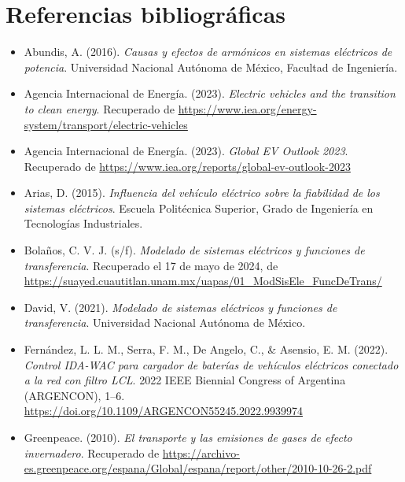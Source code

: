 \section{Referencias bibliogr\'aficas}
\label{sec:referencias}

\begin{itemize}
  \item Abundis, A. (2016). \textit{Causas y efectos de arm\'onicos en sistemas el\'ectricos de potencia}. Universidad Nacional Aut\'onoma de M\'exico, Facultad de Ingenier\'ia.
  
  \item Agencia Internacional de Energ\'ia. (2023). \textit{Electric vehicles and the transition to clean energy}. Recuperado de \url{https://www.iea.org/energy-system/transport/electric-vehicles}
  
  \item Agencia Internacional de Energ\'ia. (2023). \textit{Global EV Outlook 2023}. Recuperado de \url{https://www.iea.org/reports/global-ev-outlook-2023}
  
  \item Arias, D. (2015). \textit{Influencia del veh\'iculo el\'ectrico sobre la fiabilidad de los sistemas el\'ectricos}. Escuela Polit\'ecnica Superior, Grado de Ingenier\'ia en Tecnolog\'ias Industriales.
  
  \item Bola\~nos, C. V. J. (s/f). \textit{Modelado de sistemas el\'ectricos y funciones de transferencia}. Recuperado el 17 de mayo de 2024, de \url{https://suayed.cuautitlan.unam.mx/uapas/01_ModSisEle_FuncDeTrans/}
  
  \item David, V. (2021). \textit{Modelado de sistemas el\'ectricos y funciones de transferencia}. Universidad Nacional Aut\'onoma de M\'exico.
  
  \item Fern\'andez, L. L. M., Serra, F. M., De Angelo, C., \& Asensio, E. M. (2022). \textit{Control IDA-WAC para cargador de bater\'ias de veh\'iculos el\'ectricos conectado a la red con filtro LCL}. 2022 IEEE Biennial Congress of Argentina (ARGENCON), 1–6. \url{https://doi.org/10.1109/ARGENCON55245.2022.9939974}
  
  \item Greenpeace. (2010). \textit{El transporte y las emisiones de gases de efecto invernadero}. Recuperado de \url{https://archivo-es.greenpeace.org/espana/Global/espana/report/other/2010-10-26-2.pdf}
  

\end{itemize}

